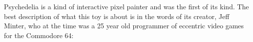 \begin{figure}[H]
    \begin{adjustbox}{width=10cm,center}
      \hspace{0.1cm}
    \end{adjustbox}
\end{figure}

Psychedelia is a kind of interactive pixel painter and was the first of its kind. 
The best description of what this toy is about is in the words of its creator, Jeff Minter, who at the time was
a 25 year old programmer of eccentric video games for the Commodore 64:

